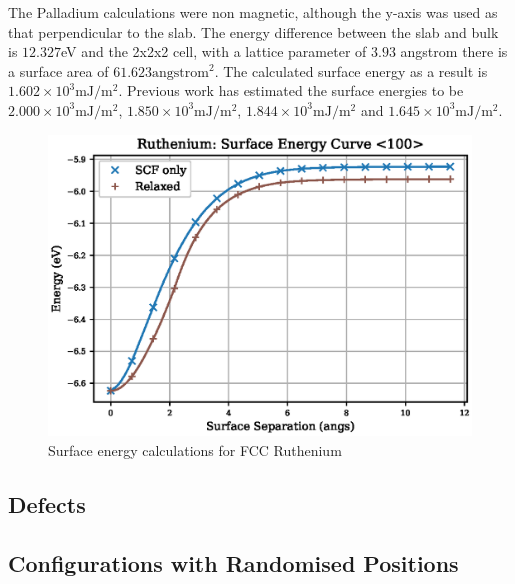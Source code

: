 The Palladium calculations were non magnetic, although the y-axis was used as that perpendicular to the slab.  The energy difference between the slab and bulk is $12.327$eV and the 2x2x2 cell, with a lattice parameter of $3.93$ angstrom there is a surface area of $61.623 \text{angstrom}^2$.  The calculated surface energy as a result is $1.602 \times 10^3 \text{mJ}/\text{m}^2$.  Previous work has estimated the surface energies to be $2.000 \times 10^3 \text{mJ}/\text{m}^2$\cite{pdsurfaceenergy},  $1.850 \times 10^3 \text{mJ}/\text{m}^2$\cite{pdsurfaceenergy},  $1.844 \times 10^3 \text{mJ}/\text{m}^2$\cite{pdsurfaceenergy} and $1.645 \times 10^3 \text{mJ}/\text{m}^2$\cite{shengeamonline}.


\begin{figure}[h]
\begin{center}
\includegraphics[width=0.5\linewidth]{chapters/results_dft_reference_db/plots/ru/ru_surface_energy.eps}
\caption{Surface energy calculations for FCC Ruthenium}
\label{fig:rusurfaceenergy}
\end{center}
\end{figure}




\subsection{Defects}





\subsection{Configurations with Randomised Positions}





